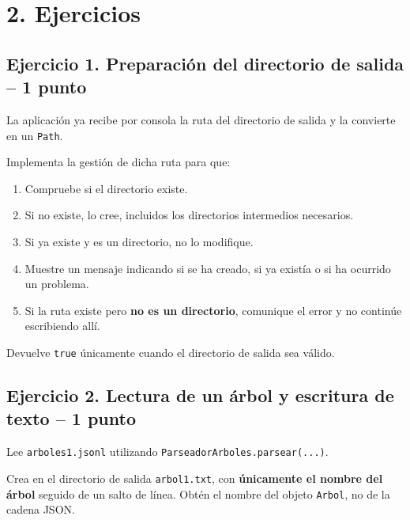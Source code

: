 \documentclass[a4paper,12pt]{article}
\begin{document}
\section*{\color{primary}2. Ejercicios}

\subsection*{\color{secondary}Ejercicio 1. Preparación del directorio de salida  --  1 punto}

La aplicación ya recibe por consola la ruta del directorio de salida y la convierte en un \texttt{Path}.\par

Implementa la gestión de dicha ruta para que:\par

\begin{enumerate}
\item Compruebe si el directorio existe.
\item Si no existe, lo cree, incluidos los directorios intermedios necesarios.
\item Si ya existe y es un directorio, no lo modifique.
\item Muestre un mensaje indicando si se ha creado, si ya existía o si ha ocurrido un problema.
\item Si la ruta existe pero \textbf{no es un directorio}, comunique el error y no continúe escribiendo allí.
\end{enumerate}

Devuelve \texttt{true} únicamente cuando el directorio de salida sea válido.\par

\subsection*{\color{secondary}Ejercicio 2. Lectura de un árbol y escritura de texto  --  1 punto}

Lee \texttt{arboles1.jsonl} utilizando \texttt{P\allowbreak{}a\allowbreak{}r\allowbreak{}s\allowbreak{}e\allowbreak{}a\allowbreak{}d\allowbreak{}o\allowbreak{}r\allowbreak{}A\allowbreak{}r\allowbreak{}b\allowbreak{}o\allowbreak{}l\allowbreak{}e\allowbreak{}s\allowbreak{}.\allowbreak{}p\allowbreak{}a\allowbreak{}r\allowbreak{}s\allowbreak{}e\allowbreak{}a\allowbreak{}r\allowbreak{}(\allowbreak{}.\allowbreak{}.\allowbreak{}.\allowbreak{})}.\par

Crea en el directorio de salida \texttt{arbol1.txt}, con \textbf{únicamente el nombre del árbol} seguido de un salto de línea. Obtén el nombre del objeto \texttt{Arbol}, no de la cadena JSON.\par
\end{document}
